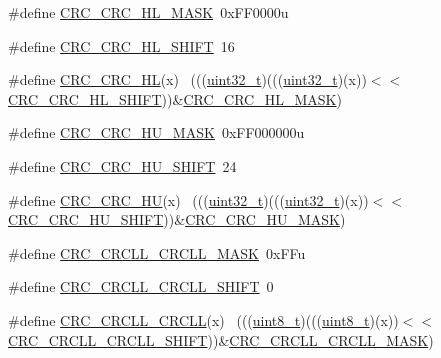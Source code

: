 \begin{DoxyCompactItemize}
\item 
\#define \hyperlink{group___c_r_c___register___masks_ga3bda7420d175ce8cfc9acf5726265dad}{C\+R\+C\+\_\+\+C\+R\+C\+\_\+\+H\+L\+\_\+\+M\+A\+SK}~0x\+F\+F0000u
\item 
\#define \hyperlink{group___c_r_c___register___masks_ga48dd9ee135e23cc28dfb3574ec525161}{C\+R\+C\+\_\+\+C\+R\+C\+\_\+\+H\+L\+\_\+\+S\+H\+I\+FT}~16
\item 
\#define \hyperlink{group___c_r_c___register___masks_ga2a85a4bfea71cb8ddea4102adf856f21}{C\+R\+C\+\_\+\+C\+R\+C\+\_\+\+HL}(x)                                                    ~(((\hyperlink{_p_e___types_8h_a33594304e786b158f3fb30289278f5af}{uint32\+\_\+t})(((\hyperlink{_p_e___types_8h_a33594304e786b158f3fb30289278f5af}{uint32\+\_\+t})(x))$<$$<$\hyperlink{group___c_r_c___register___masks_ga48dd9ee135e23cc28dfb3574ec525161}{C\+R\+C\+\_\+\+C\+R\+C\+\_\+\+H\+L\+\_\+\+S\+H\+I\+FT}))\&\hyperlink{group___c_r_c___register___masks_ga3bda7420d175ce8cfc9acf5726265dad}{C\+R\+C\+\_\+\+C\+R\+C\+\_\+\+H\+L\+\_\+\+M\+A\+SK})
\item 
\#define \hyperlink{group___c_r_c___register___masks_gadebf00a86844fdfa04e5d0294b63ac2d}{C\+R\+C\+\_\+\+C\+R\+C\+\_\+\+H\+U\+\_\+\+M\+A\+SK}~0x\+F\+F000000u
\item 
\#define \hyperlink{group___c_r_c___register___masks_ga5d9a6f28d57145c1b989afb94ceace63}{C\+R\+C\+\_\+\+C\+R\+C\+\_\+\+H\+U\+\_\+\+S\+H\+I\+FT}~24
\item 
\#define \hyperlink{group___c_r_c___register___masks_ga76e17f81fb30f319a1a550dd1b315c0d}{C\+R\+C\+\_\+\+C\+R\+C\+\_\+\+HU}(x)                                                    ~(((\hyperlink{_p_e___types_8h_a33594304e786b158f3fb30289278f5af}{uint32\+\_\+t})(((\hyperlink{_p_e___types_8h_a33594304e786b158f3fb30289278f5af}{uint32\+\_\+t})(x))$<$$<$\hyperlink{group___c_r_c___register___masks_ga5d9a6f28d57145c1b989afb94ceace63}{C\+R\+C\+\_\+\+C\+R\+C\+\_\+\+H\+U\+\_\+\+S\+H\+I\+FT}))\&\hyperlink{group___c_r_c___register___masks_gadebf00a86844fdfa04e5d0294b63ac2d}{C\+R\+C\+\_\+\+C\+R\+C\+\_\+\+H\+U\+\_\+\+M\+A\+SK})
\item 
\#define \hyperlink{group___c_r_c___register___masks_ga18c915c75953ef8fc41ed89062d62d64}{C\+R\+C\+\_\+\+C\+R\+C\+L\+L\+\_\+\+C\+R\+C\+L\+L\+\_\+\+M\+A\+SK}~0x\+F\+Fu
\item 
\#define \hyperlink{group___c_r_c___register___masks_ga06b93610ab126fe3ae564a62eed6413c}{C\+R\+C\+\_\+\+C\+R\+C\+L\+L\+\_\+\+C\+R\+C\+L\+L\+\_\+\+S\+H\+I\+FT}~0
\item 
\#define \hyperlink{group___c_r_c___register___masks_ga72310ff587461fb7b7cabd47dbf6f011}{C\+R\+C\+\_\+\+C\+R\+C\+L\+L\+\_\+\+C\+R\+C\+LL}(x)                                          ~(((\hyperlink{_p_e___types_8h_aba7bc1797add20fe3efdf37ced1182c5}{uint8\+\_\+t})(((\hyperlink{_p_e___types_8h_aba7bc1797add20fe3efdf37ced1182c5}{uint8\+\_\+t})(x))$<$$<$\hyperlink{group___c_r_c___register___masks_ga06b93610ab126fe3ae564a62eed6413c}{C\+R\+C\+\_\+\+C\+R\+C\+L\+L\+\_\+\+C\+R\+C\+L\+L\+\_\+\+S\+H\+I\+FT}))\&\hyperlink{group___c_r_c___register___masks_ga18c915c75953ef8fc41ed89062d62d64}{C\+R\+C\+\_\+\+C\+R\+C\+L\+L\+\_\+\+C\+R\+C\+L\+L\+\_\+\+M\+A\+SK})
$$
\end{DoxyCompactItemize}

